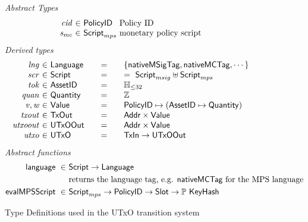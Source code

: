 \begin{figure*}[t!]
  \emph{Abstract Types}
  \begin{equation*}
    \begin{array}{r@{~\in~}l@{~}lr}
      \var{cid} & \PolicyID & \text{Policy ID} \\
      \var{s_{mc}} & \ScriptMPS & \text{monetary policy script}
     \end{array}
  \end{equation*}
  \emph{Derived types}
  \begin{equation*}
    \begin{array}{r@{~\in~}l@{\qquad=\qquad}lr}
      \var{lng} & \Language & \{\mathsf{nativeMSigTag}, \mathsf{nativeMCTag}, \cdots\} \\
      \var{scr} & \Script &=~ \ScriptMSig \uniondistinct \ScriptMPS \\

      \var{tok} & \AssetID & \mathbb{H}_{\leq 32}\\
      \var{quan} & \Quantity & \Z \\
      \var{v}, \var{w} & \Value
      & \PolicyID \mapsto ( \AssetID \mapsto \Quantity ) \\
      \var{txout}
      & \TxOut
      & \Addr \times \Value
      \\
      \var{utxoout}
      & \UTxOOut
      & \Addr \times \Value \\
      \var{utxo}
      & \UTxO
      & \TxIn \to \UTxOOut
    \end{array}
  \end{equation*}
  \emph{Abstract functions}
  \begin{align*}
    \mathsf{language} ~\in~    & \mathsf{Script} \to \mathsf{Language} \\
                            & \text{returns the language tag, e.g. $\mathsf{nativeMCTag}$ for the MPS language} \\
    \mathsf{evalMPSScript}~\in~& \mathsf{Script}_{mps}\to\mathsf{PolicyID}\to\mathsf{Slot}\to\mathbb{P}~\mathsf{KeyHash} \\
  \end{align*}

  \caption{Type Definitions used in the UTxO transition system}
  \label{fig:defs:utxo-shelley-1}
\end{figure*}

